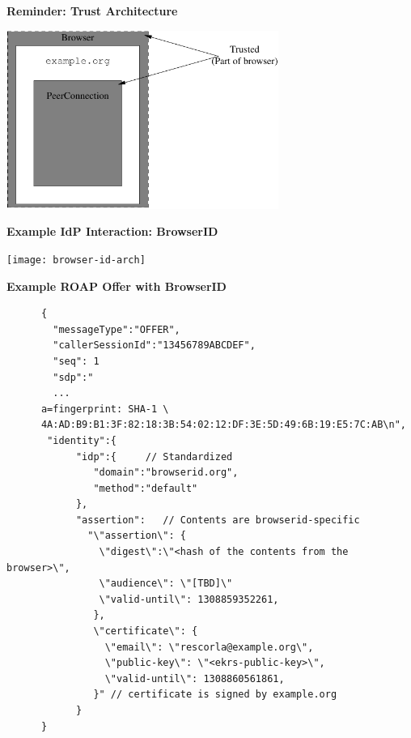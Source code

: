 \documentclass[helvetica]{seminar}
\newcommand{\heading}[1]{%
  \begin{center} 
    \large\bf 
    #1 
  \end{center} 
  \vspace{.4 in}}
\begin{document}
\begin{slide}
\heading{Reminder: Trust Architecture}

\begin{center}
\includegraphics[width=3.5in]{rtcweb-security-arch-no-idp}
\end{center}

\end{slide}




\begin{slide}
\heading{Example IdP Interaction: BrowserID}

\texttt{[image: browser-id-arch]}
\end{slide}

\begin{slide}
\heading{Example ROAP Offer with BrowserID}

\begin{tiny}
\begin{verbatim}
      {
        "messageType":"OFFER",
        "callerSessionId":"13456789ABCDEF",
        "seq": 1
        "sdp":"
        ...
      a=fingerprint: SHA-1 \
      4A:AD:B9:B1:3F:82:18:3B:54:02:12:DF:3E:5D:49:6B:19:E5:7C:AB\n",
       "identity":{
            "idp":{     // Standardized
               "domain":"browserid.org",
               "method":"default"
            },
            "assertion":   // Contents are browserid-specific
              "\"assertion\": {
                \"digest\":\"<hash of the contents from the browser>\",
                \"audience\": \"[TBD]\"
                \"valid-until\": 1308859352261,
               },
               \"certificate\": {
                 \"email\": \"rescorla@example.org\",
                 \"public-key\": \"<ekrs-public-key>\",
                 \"valid-until\": 1308860561861,
               }" // certificate is signed by example.org
            }
      }
\end{verbatim}
\end{tiny}
\end{slide}
\end{document}

